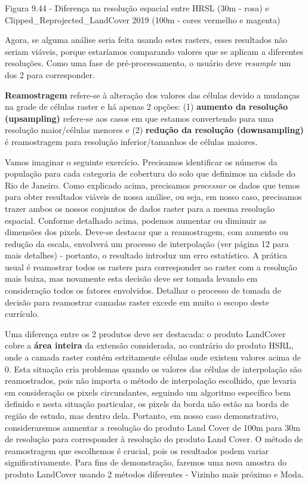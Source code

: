 \documentclass[
]{book}
\begin{document}
Figura 9.44 - Diferença na resolução espacial entre HRSL (30m - rosa) e Clipped\_Reprojected\_LandCover 2019 (100m - cores vermelho e magenta)

Agora, se alguma análise seria feita usando estes rasters, esses resultados não seriam viáveis, porque estaríamos comparando valores que se aplicam a diferentes resoluções. Como uma fase de pré-processamento, o usuário deve \emph{resample} um dos 2 para corresponder.

\textbf{Reamostragem} refere-se à alteração dos valores das células devido a mudanças na grade de células raster e há apenas 2 opções: (1) \textbf{aumento da resolução (upsampling)} refere-se aos casos em que estamos convertendo para uma resolução maior/células menores e (2) \textbf{redução da resolução (downsampling)} é reamostragem para resolução inferior/tamanhos de células maiores.

Vamos imaginar o seguinte exercício. Precisamos identificar os números da população para cada categoria de cobertura do solo que definimos na cidade do Rio de Janeiro. Como explicado acima, precisamos \emph{processar} os dados que temos para obter resultados viáveis \hspace{0pt}\hspace{0pt}de nossa análise, ou seja, em nosso caso, precisamos trazer ambos os nossos conjuntos de dados raster para a mesma resolução espacial. Conforme detalhado acima, podemos aumentar ou diminuir as dimensões dos pixels. Deve-se destacar que a reamostragem, com aumento ou redução da escala, envolverá um processo de interpolação (ver página 12 para mais detalhes) - portanto, o resultado introduz um erro estatístico. A prática usual é reamostrar todos os rasters para corresponder ao raster com a resolução mais baixa, mas novamente esta decisão deve ser tomada levando em consideração todos os fatores envolvidos. Detalhar o processo de tomada de decisão para reamostrar camadas raster excede em muito o escopo deste currículo.

Uma diferença entre os 2 produtos deve ser destacada: o produto LandCover cobre a \textbf{área inteira} da extensão considerada, ao contrário do produto HSRL, onde a camada raster contém estritamente células onde existem valores acima de 0. Esta situação cria problemas quando os valores das células de interpolação são reamostrados, pois não importa o método de interpolação escolhido, que levaria em consideração os pixels circundantes, seguindo um algoritmo específico bem definido e nesta situação particular, os pixels da borda não estão na borda de região de estudo, mas dentro dela. Portanto, em nosso caso demonstrativo, consideraremos aumentar a resolução do produto Land Cover de 100m para 30m de resolução para corresponder à resolução do produto Land Cover. O método de reamostragem que escolhemos é crucial, pois os resultados podem variar significativamente. Para fins de demonstração, faremos uma nova amostra do produto LandCover usando 2 métodos diferentes - Vizinho mais próximo e Moda.
\end{document}
